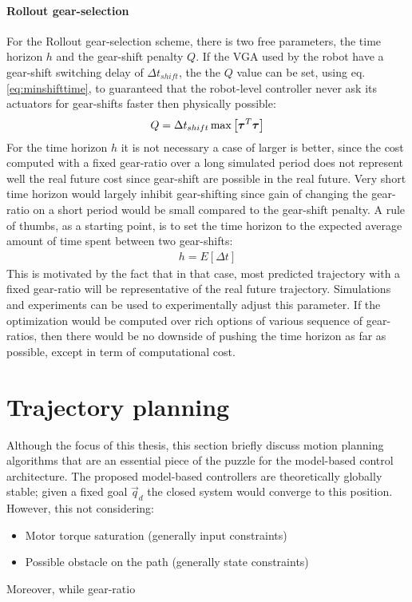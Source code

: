 \paragraph{Rollout gear-selection}
%
For the Rollout gear-selection scheme, there is two free parameters, the time horizon $h$ and the gear-shift penalty $Q$. If the VGA used by the robot have a gear-shift switching delay of $\Delta t_{shift}$, the the $Q$ value can be set, using eq. \eqref{eq:minshifttime}, to guaranteed that the robot-level controller never ask its actuators for gear-shifts faster then physically possible:
%
\begin{align}
Q = \Delta t_{shift} \operatornamewithlimits{max} \left[ \vec{\tau}^T \vec{\tau} \right]
\end{align}
%
For the time horizon $h$ it is not necessary a case of larger is better, since the cost computed with a fixed gear-ratio over a long simulated period does not represent well the real future cost since gear-shift are possible in the real future. Very short time horizon would largely inhibit gear-shifting since gain of changing the gear-ratio on a short period would be small compared to the gear-shift penalty. A rule of thumbs, as a starting point, is to set the time horizon to the expected average amount of time spent between two gear-shifts:
%
\begin{align}
h = E \left[ \Delta t \right]
\end{align}
%
This is motivated by the fact that in that case, most predicted trajectory with a fixed gear-ratio will be representative of the real future trajectory. Simulations and experiments can be used to experimentally adjust this parameter. If the optimization would be computed over rich options of various sequence of gear-ratios, then there would be no downside of pushing the time horizon as far as possible, except in term of computational cost.



\newpage
\section{Trajectory planning}
\label{sec:SamplingBasedTrajectoryPlanner}

Although the focus of this thesis, this section briefly discuss motion planning algorithms that are an essential piece of the puzzle for the model-based control architecture. The proposed model-based controllers are theoretically globally stable; given a fixed goal $\vec{q}_d$ the closed system would converge to this position. However, this not considering:
%
\begin{itemize}
	\item Motor torque saturation (generally input constraints)
	\item Possible obstacle on the path (generally state constraints)
\end{itemize}
%
Moreover, while gear-ratio 


